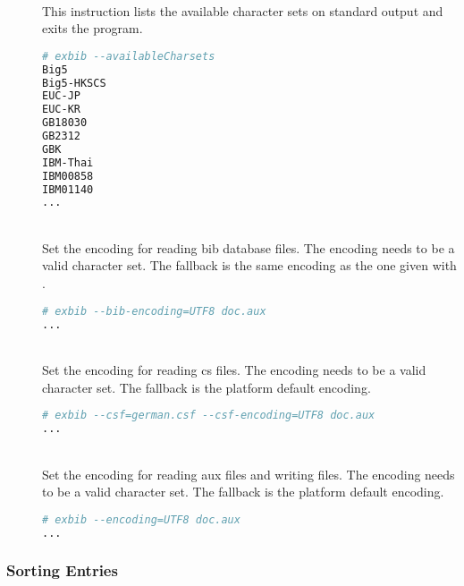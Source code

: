 \begin{description}
\item[]\ \\
  This instruction lists the available character sets on standard
  output and exits the program.
\begin{lstlisting}[language=sh]
# exbib --availableCharsets
Big5
Big5-HKSCS
EUC-JP
EUC-KR
GB18030
GB2312
GBK
IBM-Thai
IBM00858
IBM01140
...
\end{lstlisting}

\item[ ]
\item[ ]
\item[ ]\ \\
  Set the encoding for reading bib database files. The encoding needs
  to be a valid character set. The fallback is the same encoding as
  the one given with .
\begin{lstlisting}[language=sh]
# exbib --bib-encoding=UTF8 doc.aux
...
\end{lstlisting}

\item[ ]
\item[ ]\ \\
  Set the encoding for reading cs files. The encoding needs to be a
  valid character set. The fallback is the platform default encoding.
\begin{lstlisting}[language=sh]
# exbib --csf=german.csf --csf-encoding=UTF8 doc.aux
...
\end{lstlisting}

\item[ ]
\item[ ]\ \\
  Set the encoding for reading aux files and writing files. The
  encoding needs to be a valid character set. The fallback is the
  platform default encoding.
\begin{lstlisting}[language=sh]
# exbib --encoding=UTF8 doc.aux
...
\end{lstlisting}

\end{description}

\subsubsection{Sorting Entries}%

